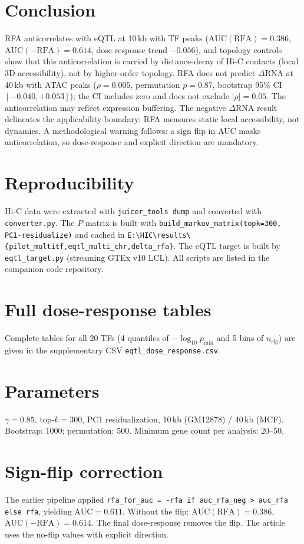 \documentclass[11pt,a4paper]{article}
\begin{document}
\section{Conclusion}
RFA anticorrelates with eQTL at 10\,kb with TF peaks ($\mathrm{AUC}(\mathrm{RFA})=0.386$, $\mathrm{AUC}(-\mathrm{RFA})=0.614$, dose-response trend $-0.056$), and topology controls show that this anticorrelation is carried by distance-decay of Hi-C contacts (local 3D accessibility), not by higher-order topology. RFA does not predict $\Delta$RNA at 40\,kb with ATAC peaks ($\rho=0.005$, permutation $p=0.87$, bootstrap 95\% CI $[-0.040, +0.053]$); the CI includes zero and does not exclude $|\rho|=0.05$. The anticorrelation may reflect expression buffering. The negative $\Delta$RNA result delineates the applicability boundary: RFA measures static local accessibility, not dynamics. A methodological warning follows: a sign flip in AUC masks anticorrelation, so dose-response and explicit direction are mandatory.

\appendix
\section{Reproducibility}
Hi-C data were extracted with \texttt{juicer\_tools dump} and converted with \texttt{converter.py}. The $P$ matrix is built with \texttt{build\_markov\_matrix(topk=300, PC1-residualize)} and cached in \texttt{E:\textbackslash HIC\textbackslash results\textbackslash\{pilot\_multitf,eqtl\_multi\_chr,delta\_rfa\}}. The eQTL target is built by \texttt{eqtl\_target.py} (streaming GTEx v10 LCL). All scripts are listed in the companion code repository.

\section{Full dose-response tables}
Complete tables for all 20 TFs (4 quantiles of $-\log_{10} p_{\min}$ and 5 bins of $n_{\mathrm{sig}}$) are given in the supplementary CSV \texttt{eqtl\_dose\_response.csv}.

\section{Parameters}
$\gamma=0.85$, top-$k=300$, PC1 residualization, 10\,kb (GM12878) / 40\,kb (MCF). Bootstrap: 1000; permutation: 500. Minimum gene count per analysis: 20--50.

\section{Sign-flip correction}
The earlier pipeline applied \texttt{rfa\_for\_auc = -rfa if auc\_rfa\_neg > auc\_rfa else rfa}, yielding $\mathrm{AUC}=0.611$. Without the flip: $\mathrm{AUC}(\mathrm{RFA})=0.386$, $\mathrm{AUC}(-\mathrm{RFA})=0.614$. The final dose-response removes the flip. The article uses the no-flip values with explicit direction.
\end{document}
